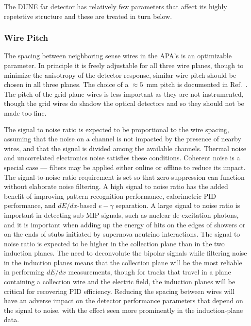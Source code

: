 The DUNE far detector has relatively few parameters that affect its highly repetetive
structure and these are treated in turn below.

\subsubsection{Wire Pitch}

The spacing between neighboring sense wires in the APA's is an optimizable parameter.  In principle
it is freely adjustable for all three wire planes, though to minimize the anisotropy of the
detector response, similar wire pitch should be chosen in all three planes.  The choice of
a $\approx 5$~mm pitch is documented in Ref.~\cite{docdb-3407}.  The pitch of the
grid plane wires is less important as they are not instrumented,
though the grid wires do shadow the optical detectors and so
they should not be made too fine.

The signal to noise ratio is expected to be proportional to the wire spacing, assuming that
the noise on a channel is not impacted by the presence of nearby wires, and that the signal
is divided among the available channels.  Thermal noise and uncorrelated electronics noise satisfies
these conditions.  Coherent noise is a special case --- filters may be applied either online
or offline to reduce its impact.  The signal-to-noise ratio requirement is set so that
zero-suppression can function without elaborate noise filtering.  A high signal to noise 
ratio has the added benefit
of improving pattern-recognition performance, calorimetric PID performance, and $dE/dx$-based
$e-\gamma$ separation.  A large signal to noise ratio is important in detecting sub-MIP signals,
such as nuclear de-excitation photons, and it is 
important when adding up the energy of hits on the edges of showers or on the ends of stubs initiated
by supernova neutrino interactions.
The signal to noise ratio is expected to be higher in the collection
plane than in the two induction planes.  The need to deconvolute the bipolar
signals while filtering noise in the induction planes means that the collection plane will
be the most reliable in performing $dE/dx$ measurements, though for tracks that travel
in a plane containing a collection wire and the electric field, the induction planes will
be critical for recovering PID efficiency.  Reducing the spacing between wires will have an
adverse impact on the detector performance parameters that depend on the signal to noise, 
with the effect seen more prominently in the
induction-plane data.

